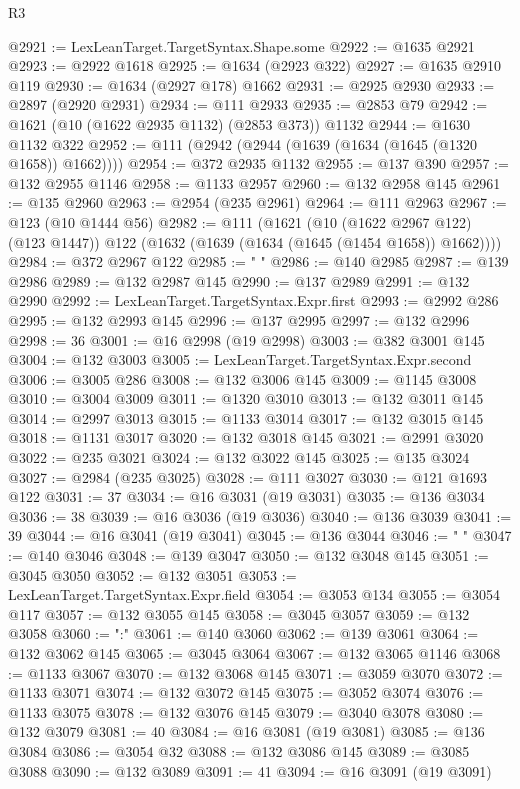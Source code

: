 \begin{lexlean}{R3}
\begin{coremodule}
@2921 := LexLeanTarget.TargetSyntax.Shape.some
@2922 := @1635 @2921
@2923 := @2922 @1618
@2925 := @1634 (@2923 @322)
@2927 := @1635 @2910 @119
@2930 := @1634 (@2927 @178) @1662
@2931 := @2925 @2930
@2933 := @2897 (@2920 @2931)
@2934 := @111 @2933
@2935 := @2853 @79
@2942 := @1621 (@10 (@1622 @2935 @1132) (@2853 @373)) @1132
@2944 := @1630 @1132 @322
@2952 := @111 (@2942 (@2944 (@1639 (@1634 (@1645 (@1320 @1658)) @1662))))
@2954 := @372 @2935 @1132
@2955 := @137 @390
@2957 := @132 @2955 @1146
@2958 := @1133 @2957
@2960 := @132 @2958 @145
@2961 := @135 @2960
@2963 := @2954 (@235 @2961)
@2964 := @111 @2963
@2967 := @123 (@10 @1444 @56)
@2982 := @111
    (@1621
      (@10 (@1622 @2967 @122) (@123 @1447))
      @122
      (@1632 (@1639 (@1634 (@1645 (@1454 @1658)) @1662))))
@2984 := @372 @2967 @122
@2985 := "            "
@2986 := @140 @2985
@2987 := @139 @2986
@2989 := @132 @2987 @145
@2990 := @137 @2989
@2991 := @132 @2990
@2992 := LexLeanTarget.TargetSyntax.Expr.first
@2993 := @2992 @286
@2995 := @132 @2993 @145
@2996 := @137 @2995
@2997 := @132 @2996
@2998 := 36
@3001 := @16 @2998 (@19 @2998)
@3003 := @382 @3001 @145
@3004 := @132 @3003
@3005 := LexLeanTarget.TargetSyntax.Expr.second
@3006 := @3005 @286
@3008 := @132 @3006 @145
@3009 := @1145 @3008
@3010 := @3004 @3009
@3011 := @1320 @3010
@3013 := @132 @3011 @145
@3014 := @2997 @3013
@3015 := @1133 @3014
@3017 := @132 @3015 @145
@3018 := @1131 @3017
@3020 := @132 @3018 @145
@3021 := @2991 @3020
@3022 := @235 @3021
@3024 := @132 @3022 @145
@3025 := @135 @3024
@3027 := @2984 (@235 @3025)
@3028 := @111 @3027
@3030 := @121 @1693 @122
@3031 := 37
@3034 := @16 @3031 (@19 @3031)
@3035 := @136 @3034
@3036 := 38
@3039 := @16 @3036 (@19 @3036)
@3040 := @136 @3039
@3041 := 39
@3044 := @16 @3041 (@19 @3041)
@3045 := @136 @3044
@3046 := "  "
@3047 := @140 @3046
@3048 := @139 @3047
@3050 := @132 @3048 @145
@3051 := @3045 @3050
@3052 := @132 @3051
@3053 := LexLeanTarget.TargetSyntax.Expr.field
@3054 := @3053 @134
@3055 := @3054 @117
@3057 := @132 @3055 @145
@3058 := @3045 @3057
@3059 := @132 @3058
@3060 := ":"
@3061 := @140 @3060
@3062 := @139 @3061
@3064 := @132 @3062 @145
@3065 := @3045 @3064
@3067 := @132 @3065 @1146
@3068 := @1133 @3067
@3070 := @132 @3068 @145
@3071 := @3059 @3070
@3072 := @1133 @3071
@3074 := @132 @3072 @145
@3075 := @3052 @3074
@3076 := @1133 @3075
@3078 := @132 @3076 @145
@3079 := @3040 @3078
@3080 := @132 @3079
@3081 := 40
@3084 := @16 @3081 (@19 @3081)
@3085 := @136 @3084
@3086 := @3054 @32
@3088 := @132 @3086 @145
@3089 := @3085 @3088
@3090 := @132 @3089
@3091 := 41
@3094 := @16 @3091 (@19 @3091)

\end{coremodule}
\end{lexlean}
